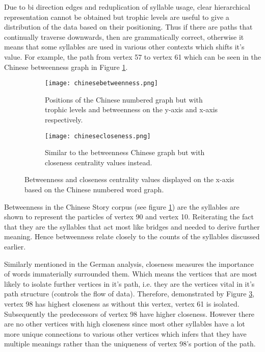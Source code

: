 Due to bi direction edges and reduplication of syllable usage, clear hierarchical representation cannot be obtained but trophic levels are useful to give a distribution of the data based on their positioning. Thus if there are paths that continually traverse downwards, then are grammatically correct, otherwise it means that some syllables are used in various other contexts which shifts it's value. For example, the path from vertex 57 to vertex 61 which can be seen in the Chinese betweenness graph in Figure \ref{fig:cnbc}. 

\begin{figure}[H]
\centering
\begin{subfigure}{.45\textwidth}
	\hspace{-1cm} 
	\texttt{[image: chinesebetweenness.png]}
	\caption{Positions of the Chinese numbered graph but with trophic levels and betweenness on the y-axis and x-axis respectively.}
	\label{fig:cnbc}
\end{subfigure}
\hfill
\begin{subfigure}{.45\textwidth}
	\hspace{-1cm} 
	\texttt{[image: chinesecloseness.png]}
	\caption{Similar to the betweenness Chinese graph but with closeness centrality values instead. }
	\label{fig:cncc}
\end{subfigure}
\caption{Betweenness and closeness centrality values displayed on the x-axis based on the Chinese numbered word graph.}
\label{fig:cncentrality}
\end{figure}

Betweenness in the Chinese Story corpus (see figure \ref{fig:cnbc}) are the syllables are shown to represent the particles of vertex 90 and vertex 10. Reiterating the fact that they are the syllables that act most like bridges and needed to derive further meaning. Hence betweenness relate closely to the counts of the syllables discussed earlier.

Similarly mentioned in the German analysis, closeness measures the importance of words immaterially surrounded them. Which means the vertices that are most likely to isolate further vertices in it's path, i.e. they are the vertices vital in it's path structure (controls the flow of data). Therefore, demonstrated by Figure \ref{fig:cncentrality}, vertex 98 has highest closeness as without this vertex, vertex 61 is isolated. Subsequently the predecessors of vertex 98 have higher closeness. However there are no other vertices with high closeness since most other syllables have a lot more unique connections to various other vertices which infers that they have multiple meanings rather than the uniqueness of vertex 98's portion of the path.



